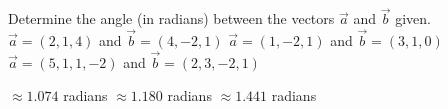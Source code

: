 
\begin{Exercise}[
name={},
title={}, 
difficulty=0,
origin={\cite{SM}}]
Determine the angle (in radians) between the vectors $\vec{a}$ and $\vec{b}$ given.
\Question $\vec{a} = (2,1,4)$ and $\vec{b} = (4,-2,1)$
\Question $\vec{a} = (1,-2,1)$ and $\vec{b} = (3,1,0)$
\Question $\vec{a} = (5,1,1,-2)$ and $\vec{b} = (2,3,-2,1)$
\end{Exercise}

\begin{Answer}
\Question $\approx 1.074$ radians
\Question $\approx 1.180$ radians
\Question $\approx 1.441$ radians
\end{Answer}
